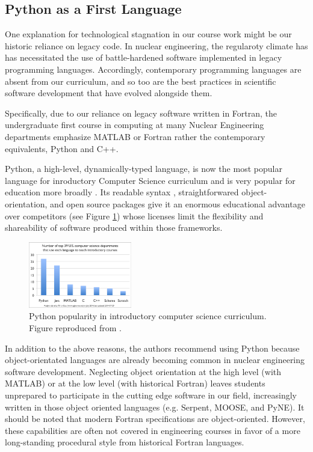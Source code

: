 \documentclass{anstrans}
\begin{document}
\subsection{Python as a First Language}

One explanation for technological stagnation in our course work might be our
historic reliance on legacy code. In nuclear engineering, the regularoty climate
has has necessitated the use of battle-hardened software implemented in legacy
programming languages. Accordingly, contemporary programming languages are
absent from our curriculum, and so too are the best practices in scientific
software development \cite{wilson_best_2014} that have evolved alongside them.

Specifically, due to our reliance on legacy software written in Fortran, the
undergraduate first course in computing at many Nuclear Engineering departments
emphasize MATLAB or Fortran rather the contemporary equivalents, Python and C++.

Python, a high-level, dynamically-typed language, is now the most popular
language for inroductory Computer Science curriculum \cite{guo_python_2014} and
is very popular for education more broadly
\cite{myers_python_2014,stajano_raising_2000,backer_computational_2007}. Its
readable syntax \cite{stefik_empirical_2013}, straightforwared
object-orientation, and open source packages give it an enormous educational
advantage over competitors (see Figure \ref{fig:guo}) whose licenses limit the
flexibility and shareability of software produced within those frameworks.

\begin{figure}[htbp!]
\begin{center}
\includegraphics[width=0.4\textwidth]{guo.eps}
\end{center}
\caption{Python popularity in introductory computer science curriculum. Figure
reproduced from \cite{guo_python_2014}. }
\label{fig:guo}
\end{figure}


In addition to the above reasons, the authors recommend using Python
because object-orientated languages are already becoming common in nuclear
engineering software development.  Neglecting object orientation at the high
level (with MATLAB) or at the low level (with historical Fortran) leaves students
unprepared to participate in the cutting edge software in our field,
increasingly written in those object oriented languages (e.g.
Serpent\cite{lepanen_serpent_2011}, MOOSE\cite{gaston_moose_2014}, and
PyNE\cite{scopatz_pyne_2013}). It should be noted that modern Fortran specifications 
are object-oriented.  However, these capabilities are often not covered in 
engineering courses in favor of a more long-standing procedural style from historical
Fortran languages.
\end{document}
